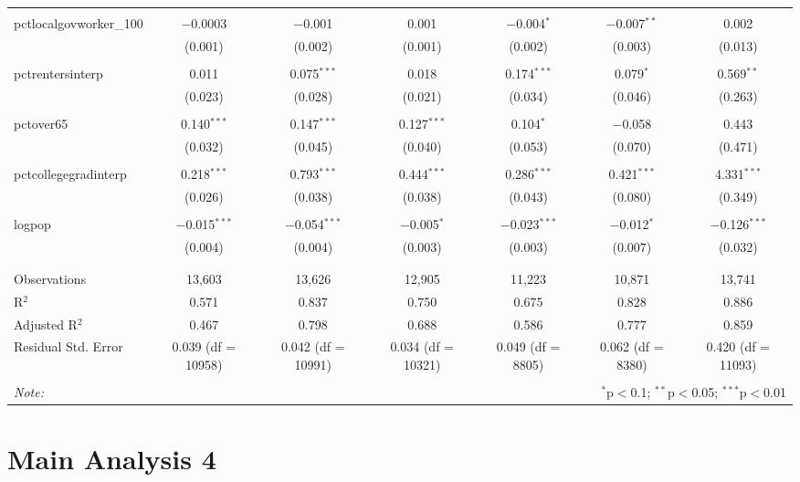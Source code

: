 \documentclass[]{article}
\begin{document}
\begin{sidewaystable}[!htbp]
\begin{tabular}{@{\extracolsep{5pt}}lcccccc}
  & & & & & & \\ 
 pctlocalgovworker\_100 & $-$0.0003 & $-$0.001 & 0.001 & $-$0.004$^{*}$ & $-$0.007$^{**}$ & 0.002 \\ 
  & (0.001) & (0.002) & (0.001) & (0.002) & (0.003) & (0.013) \\ 
  & & & & & & \\ 
 pctrentersinterp & 0.011 & 0.075$^{***}$ & 0.018 & 0.174$^{***}$ & 0.079$^{*}$ & 0.569$^{**}$ \\ 
  & (0.023) & (0.028) & (0.021) & (0.034) & (0.046) & (0.263) \\ 
  & & & & & & \\ 
 pctover65 & 0.140$^{***}$ & 0.147$^{***}$ & 0.127$^{***}$ & 0.104$^{*}$ & $-$0.058 & 0.443 \\ 
  & (0.032) & (0.045) & (0.040) & (0.053) & (0.070) & (0.471) \\ 
  & & & & & & \\ 
 pctcollegegradinterp & 0.218$^{***}$ & 0.793$^{***}$ & 0.444$^{***}$ & 0.286$^{***}$ & 0.421$^{***}$ & 4.331$^{***}$ \\ 
  & (0.026) & (0.038) & (0.038) & (0.043) & (0.080) & (0.349) \\ 
  & & & & & & \\ 
 logpop & $-$0.015$^{***}$ & $-$0.054$^{***}$ & $-$0.005$^{*}$ & $-$0.023$^{***}$ & $-$0.012$^{*}$ & $-$0.126$^{***}$ \\ 
  & (0.004) & (0.004) & (0.003) & (0.003) & (0.007) & (0.032) \\ 
  & & & & & & \\ 
\hline \\[-1.8ex] 
Observations & 13,603 & 13,626 & 12,905 & 11,223 & 10,871 & 13,741 \\ 
R$^{2}$ & 0.571 & 0.837 & 0.750 & 0.675 & 0.828 & 0.886 \\ 
Adjusted R$^{2}$ & 0.467 & 0.798 & 0.688 & 0.586 & 0.777 & 0.859 \\ 
Residual Std. Error & 0.039 (df = 10958) & 0.042 (df = 10991) & 0.034 (df = 10321) & 0.049 (df = 8805) & 0.062 (df = 8380) & 0.420 (df = 11093) \\ 
\hline 
\hline \\[-1.8ex] 
\textit{Note:}  & \multicolumn{6}{r}{$^{*}$p$<$0.1; $^{**}$p$<$0.05; $^{***}$p$<$0.01} \\ 
\end{tabular} 
\end{sidewaystable}

\hypertarget{main-analysis-4}{%
\section{Main Analysis 4}\label{main-analysis-4}}
\end{document}
